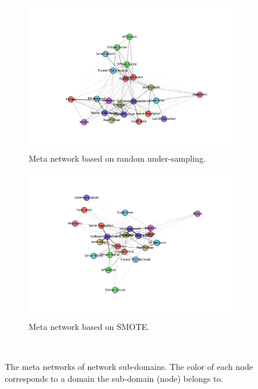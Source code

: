 \documentclass{article}
\begin{document}
\begin{figure}[H]
	\medskip
	\begin{subfigure}{0.48\textwidth}
	\includegraphics[width=\linewidth]{figs/similarity/SubDomain/RandomUnder_all5/g.png}
	\caption{Meta network based on random under-sampling.} \label{random_under_graph_sub_original}
	\end{subfigure}\hspace*{\fill}
	\begin{subfigure}{0.48\textwidth}
	\includegraphics[width=\linewidth]{figs/similarity/SubDomain/SMOTE/g.png}
	\caption{Meta network based on SMOTE.} \label{smote_graph_sub_original}
	\end{subfigure}
\
\caption{The meta networks of network sub-domains. The color of each node corresponds to a domain the sub-domain (node) belongs to.} \label{meta_network}
\end{figure}
\end{document}

